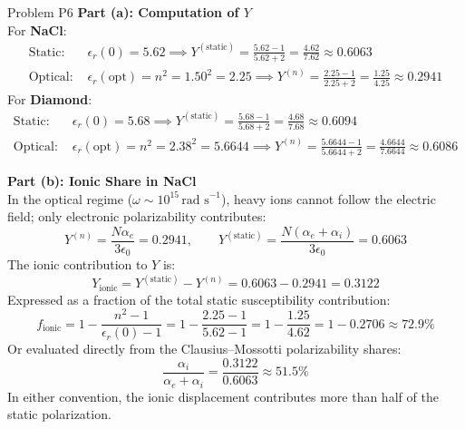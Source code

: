 \documentclass[11pt,a4paper]{article}
\begin{document}
\begin{solbox}{Problem P6}
\textbf{Part (a): Computation of $Y$} \\
For \textbf{NaCl}:
\begin{align}
    \text{Static: } & \epsilon_r(0) = 5.62 \implies Y^{(\text{static})} = \frac{5.62 - 1}{5.62 + 2} = \frac{4.62}{7.62} \approx \mathbf{0.6063} \\
    \text{Optical: } & \epsilon_r(\text{opt}) = n^2 = 1.50^2 = 2.25 \implies Y^{(n)} = \frac{2.25 - 1}{2.25 + 2} = \frac{1.25}{4.25} \approx \mathbf{0.2941}
\end{align}
For \textbf{Diamond}:
\begin{align}
    \text{Static: } & \epsilon_r(0) = 5.68 \implies Y^{(\text{static})} = \frac{5.68 - 1}{5.68 + 2} = \frac{4.68}{7.68} \approx \mathbf{0.6094} \\
    \text{Optical: } & \epsilon_r(\text{opt}) = n^2 = 2.38^2 = 5.6644 \implies Y^{(n)} = \frac{5.6644 - 1}{5.6644 + 2} = \frac{4.6644}{7.6644} \approx \mathbf{0.6086}
\end{align}

\textbf{Part (b): Ionic Share in NaCl} \\
In the optical regime ($\omega \sim 10^{15}\,\text{rad s}^{-1}$), heavy ions cannot follow the electric field; only electronic polarizability contributes:
\begin{equation}
    Y^{(n)} = \frac{N\alpha_e}{3\epsilon_0} = 0.2941, \qquad Y^{(\text{static})} = \frac{N(\alpha_e + \alpha_i)}{3\epsilon_0} = 0.6063
\end{equation}
The ionic contribution to $Y$ is:
\begin{equation}
    Y_{\text{ionic}} = Y^{(\text{static})} - Y^{(n)} = 0.6063 - 0.2941 = \mathbf{0.3122}
\end{equation}
Expressed as a fraction of the total static susceptibility contribution:
\begin{equation}
    f_{\text{ionic}} = 1 - \frac{n^2 - 1}{\epsilon_r(0) - 1} = 1 - \frac{2.25 - 1}{5.62 - 1} = 1 - \frac{1.25}{4.62} = 1 - 0.2706 \approx 72.9\%
\end{equation}
Or evaluated directly from the Clausius--Mossotti polarizability shares:
\begin{equation}
    \frac{\alpha_i}{\alpha_e + \alpha_i} = \frac{0.3122}{0.6063} \approx \mathbf{51.5\%}
\end{equation}
In either convention, the ionic displacement contributes more than half of the static polarization.


\end{solbox}
\end{document}
